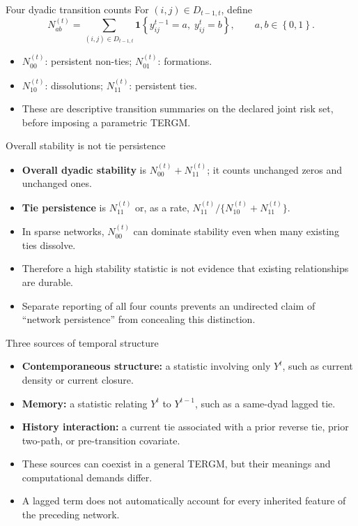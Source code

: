 \documentclass[aspectratio=169,11pt]{beamer}
\newcommand{\ind}{\mathbf{1}}
\newcommand{\term}[1]{\textbf{\color{nupurple}#1}}
\newcommand{\set}[1]{\left\{#1\right\}}
\begin{document}
\begin{frame}{Four dyadic transition counts}
For $(i,j)\in D_{t-1,t}$, define
\[
N_{ab}^{(t)}=\sum_{(i,j)\in D_{t-1,t}}
\ind\!\left\{y_{ij}^{t-1}=a,\;y_{ij}^{t}=b\right\},\qquad a,b\in\set{0,1}.
\]
\begin{itemize}
\item $N_{00}^{(t)}$: persistent non-ties; $N_{01}^{(t)}$: formations.
\item $N_{10}^{(t)}$: dissolutions; $N_{11}^{(t)}$: persistent ties.
\item These are descriptive transition summaries on the declared joint risk set, before imposing a parametric TERGM.
\end{itemize}
\end{frame}

\begin{frame}{Overall stability is not tie persistence}
\begin{itemize}
\item \term{Overall dyadic stability} is $N_{00}^{(t)}+N_{11}^{(t)}$; it counts unchanged zeros and unchanged ones.
\item \term{Tie persistence} is $N_{11}^{(t)}$ or, as a rate, $N_{11}^{(t)}/\{N_{10}^{(t)}+N_{11}^{(t)}\}$.
\item In sparse networks, $N_{00}^{(t)}$ can dominate stability even when many existing ties dissolve.
\item Therefore a high stability statistic is not evidence that existing relationships are durable.
\item Separate reporting of all four counts prevents an undirected claim of ``network persistence'' from concealing this distinction.
\end{itemize}
\end{frame}

\begin{frame}{Three sources of temporal structure}
\begin{itemize}
\item \term{Contemporaneous structure:} a statistic involving only $Y^t$, such as current density or current closure.
\item \term{Memory:} a statistic relating $Y^t$ to $Y^{t-1}$, such as a same-dyad lagged tie.
\item \term{History interaction:} a current tie associated with a prior reverse tie, prior two-path, or pre-transition covariate.
\item These sources can coexist in a general TERGM, but their meanings and computational demands differ.
\item A lagged term does not automatically account for every inherited feature of the preceding network.
\end{itemize}
\end{frame}
\end{document}
